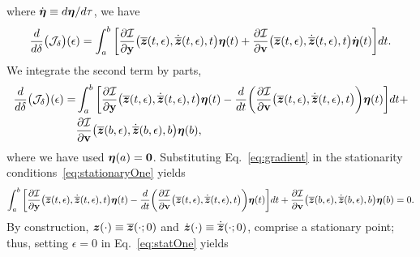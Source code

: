 \documentclass[3p,computermodern,10pt]{elsarticle}
\begin{document}
\begin{appendices}
where $\dot{\boldsymbol \eta} \equiv d \boldsymbol \eta / d\tau$, 
we have
$$
\frac{d}{d\delta} \big( \mathcal{J}_{\delta} \big)(\epsilon)
= \int_a^b \bigg[ \frac{\partial \mathcal{I}  }{\partial \mathbf{y} } \big(\overline{\boldsymbol z}(t,\epsilon),\dot{\overline{\boldsymbol z}}(t,\epsilon),t \big) \boldsymbol \eta(t)  + \frac{\partial \mathcal{I}}{\partial \mathbf{{v}} } \big(\overline{\boldsymbol z}(t,\epsilon),\dot{\overline{\boldsymbol z}}(t,\epsilon) ,t \big) \dot{\boldsymbol \eta}(t) \bigg]dt. $$
We integrate the second term by parts,
\begin{align}\label{eq:gradient}
	\begin{split}
\frac{d}{d\delta} \big( \mathcal{J}_{\delta} \big)(\epsilon)
	=&  \int_a^b  \bigg[\frac{\partial \mathcal{I}  }{\partial \mathbf{y} }
	\big(\overline{\boldsymbol z}(t,\epsilon),\dot{\overline{\boldsymbol z}}(t,\epsilon) , t \big)
	\boldsymbol \eta(t) - \frac{d}{dt}\bigg( \frac{\partial \mathcal{I}}{\partial
	\mathbf{{v}} }  \big(\overline{\boldsymbol z}(t,\epsilon),\dot{\overline{\boldsymbol z}}(t,\epsilon)
	,t \big) \bigg) \boldsymbol \eta(t) \bigg]dt + \\ &\frac{\partial \mathcal{I}}{\partial \mathbf{{v}}} \big(\overline{\boldsymbol z}(b,\epsilon),\dot{\overline{\boldsymbol z}}(b,\epsilon) ,b \big) \boldsymbol \eta(b) , 
	\end{split}
\end{align}
where we have used $\boldsymbol \eta(a) = \boldsymbol 0$.
Substituting Eq.~\eqref{eq:gradient} in the stationarity conditions~\eqref{eq:stationaryOne} yields
\begin{equation}\label{eq:statOne}
  \int_a^b  \bigg[\frac{\partial \mathcal{I}  }{\partial \mathbf{y} } \big(\overline{\boldsymbol z}(t,\epsilon),\dot{\overline{\boldsymbol z}}(t,\epsilon),t \big) \boldsymbol \eta(t) - \frac{d}{dt}\bigg( \frac{\partial \mathcal{I}}{\partial \mathbf{{v}} }  \big(\overline{\boldsymbol z}(t,\epsilon),\dot{\overline{\boldsymbol z}}(t,\epsilon),t \big) \bigg) \boldsymbol \eta(t) \bigg]dt + \frac{\partial \mathcal{I}}{\partial \mathbf{{v}}} \big(\overline{\boldsymbol z}(b,\epsilon),\dot{\overline{\boldsymbol z}}(b,\epsilon),b \big) \boldsymbol \eta(b)  = 0. 
\end{equation}
By construction, $\boldsymbol z(\cdot) \equiv \overline{\boldsymbol z}(\cdot;0)$ and $\dot{\boldsymbol z}(\cdot) \equiv \dot{\overline{\boldsymbol z}}(\cdot;0)$, comprise a stationary
point; thus, setting $\epsilon = 0$ in Eq.~\eqref{eq:statOne} yields

\end{appendices}
\end{document}

